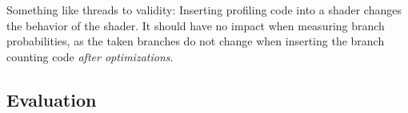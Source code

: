 \clearpage
{}
Something like threads to validity: Inserting profiling code into a shader changes the behavior of the shader.
It should have no impact when measuring branch probabilities, as the taken branches do not change when inserting the branch counting code \emph{after optimizations}.

\subsection{Evaluation}
\label{sub:evaluation}
